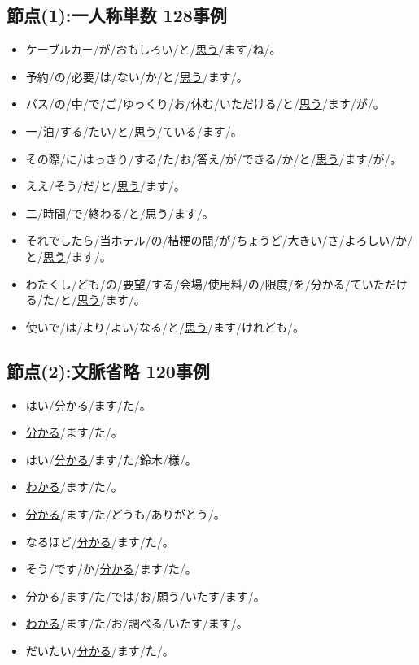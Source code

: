 \subsection{節点(1):一人称単数 128事例}
\begin{itemize}
\item ケーブルカー/が/おもしろい/と/\underline{思う}/ます/ね/。
\item 予約/の/必要/は/ない/か/と/\underline{思う}/ます/。
\item バス/の/中/で/ご/ゆっくり/お/休む/いただける/と/\underline{思う}/ます/が/。
\item 一/泊/する/たい/と/\underline{思う}/ている/ます/。
\item その際/に/はっきり/する/た/お/答え/が/できる/か/と/\underline{思う}/ます/が/。
\item ええ/そう/だ/と/\underline{思う}/ます/。
\item 二/時間/で/終わる/と/\underline{思う}/ます/。
\item それでしたら/当ホテル/の/桔梗の間/が/ちょうど/大きい/さ/よろしい/か/と/\underline{思う}/ます/。
\item わたくし/ども/の/要望/する/会場/使用料/の/限度/を/分かる/ていただける/た/と/\underline{思う}/ます/。
\item 使いで/は/より/よい/なる/と/\underline{思う}/ます/けれども/。
\end{itemize}


\subsection{節点(2):文脈省略 120事例}
\begin{itemize}
\item はい/\underline{分かる}/ます/た/。
\item \underline{分かる}/ます/た/。
\item はい/\underline{分かる}/ます/た/鈴木/様/。
\item \underline{わかる}/ます/た/。
\item \underline{分かる}/ます/た/どうも/ありがとう/。
\item なるほど/\underline{分かる}/ます/た/。
\item そう/です/か/\underline{分かる}/ます/た/。
\item \underline{分かる}/ます/た/では/お/願う/いたす/ます/。
\item \underline{わかる}/ます/た/お/調べる/いたす/ます/。
\item だいたい/\underline{分かる}/ます/た/。
\end{itemize}


